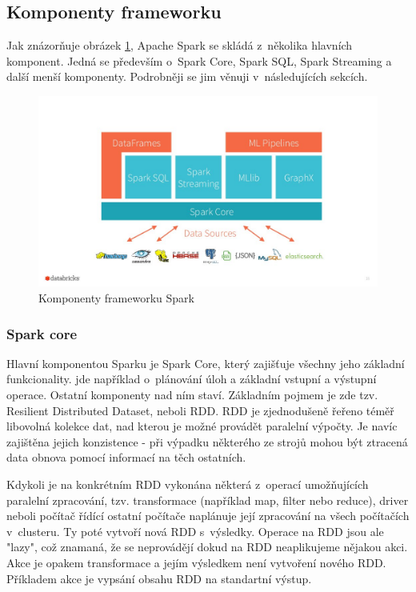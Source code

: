 \documentclass[thesis=B,czech]{FITthesis}[2012/06/26]
\begin{document}
\subsection{Komponenty frameworku}
	Jak znázorňuje obrázek \ref{fig:spark_components}, Apache Spark se skládá z~několika hlavních komponent. Jedná se především o~Spark Core, Spark SQL, Spark Streaming a další menší komponenty. Podrobněji se jim věnuji v~následujících sekcích. 
	\begin{figure}[ht]
    	\centering
    	\includegraphics[width=1\textwidth]{images/spark_engine.jpg}
    	\caption{Komponenty frameworku Spark\cite{spark-components}}
    	\label{fig:spark_components}
	\end{figure}
	
\subsubsection{Spark core}
\label{spark-core}
	Hlavní komponentou Sparku je Spark Core, který zajišťuje všechny jeho základní funkcionality. jde například o~plánování úloh a základní vstupní a výstupní operace. Ostatní komponenty nad ním staví. Základním pojmem je zde tzv. Resilient Distributed Dataset, neboli RDD. RDD je zjednodušeně řeřeno téměř libovolná kolekce dat, nad kterou je možné provádět paralelní výpočty. Je navíc zajištěna jejich konzistence - při výpadku některého ze strojů mohou být ztracená data obnova pomocí informací na těch ostatních. 
	
	Kdykoli je na konkrétním RDD vykonána některá z~operací umožňujících paralelní zpracování, tzv. transformace (například map, filter nebo reduce), driver neboli počítač řídící ostatní počítače naplánuje její zpracování na všech počítačích v~clusteru. Ty poté vytvoří nová RDD s~výsledky. Operace na RDD jsou ale "lazy", což znamaná, že se neprovádějí dokud na RDD neaplikujeme nějakou akci. Akce je opakem transformace a jejím výsledkem není vytvoření nového RDD. Příkladem akce je vypsání obsahu RDD na standartní výstup. 
\end{document}

